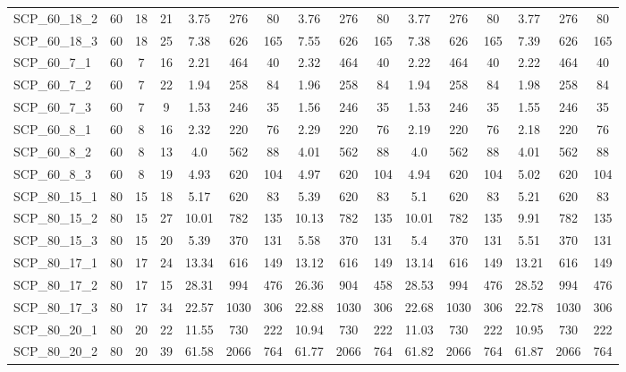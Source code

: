 \begin{sidewaystable}[!ht]
{\begin{tabular}{lccccccccccccccc}
SCP\_60\_18\_2 & 60 & 18 & 21 &  \textcolor{blue2}{3.75} & 276 & 80 & 3.76 & 276 & 80 & 3.77 & 276 & 80 & 3.77 & 276 & 80 \\
SCP\_60\_18\_3 & 60 & 18 & 25 &  \textcolor{blue2}{7.38} & 626 & 165 & 7.55 & 626 & 165 &  \textcolor{blue2}{7.38} & 626 & 165 & 7.39 & 626 & 165 \\
SCP\_60\_7\_1 & 60 & 7 & 16 &  \textcolor{blue2}{2.21} & 464 & 40 & 2.32 & 464 & 40 & 2.22 & 464 & 40 & 2.22 & 464 & 40 \\
SCP\_60\_7\_2 & 60 & 7 & 22 &  \textcolor{blue2}{1.94} & 258 & 84 & 1.96 & 258 & 84 &  \textcolor{blue2}{1.94} & 258 & 84 & 1.98 & 258 & 84 \\
SCP\_60\_7\_3 & 60 & 7 & 9 &  \textcolor{blue2}{1.53} & 246 & 35 & 1.56 & 246 & 35 &  \textcolor{blue2}{1.53} & 246 & 35 & 1.55 & 246 & 35 \\
SCP\_60\_8\_1 & 60 & 8 & 16 & 2.32 & 220 & 76 & 2.29 & 220 & 76 & 2.19 & 220 & 76 &  \textcolor{blue2}{2.18} & 220 & 76 \\
SCP\_60\_8\_2 & 60 & 8 & 13 &  \textcolor{blue2}{4.0} & 562 & 88 & 4.01 & 562 & 88 &  \textcolor{blue2}{4.0} & 562 & 88 & 4.01 & 562 & 88 \\
SCP\_60\_8\_3 & 60 & 8 & 19 &  \textcolor{blue2}{4.93} & 620 & 104 & 4.97 & 620 & 104 & 4.94 & 620 & 104 & 5.02 & 620 & 104 \\
SCP\_80\_15\_1 & 80 & 15 & 18 & 5.17 & 620 & 83 & 5.39 & 620 & 83 &  \textcolor{blue2}{5.1} & 620 & 83 & 5.21 & 620 & 83 \\
SCP\_80\_15\_2 & 80 & 15 & 27 & 10.01 & 782 & 135 & 10.13 & 782 & 135 & 10.01 & 782 & 135 &  \textcolor{blue2}{9.91} & 782 & 135 \\
SCP\_80\_15\_3 & 80 & 15 & 20 & 5.39 & 370 & 131 & 5.58 & 370 & 131 & 5.4 & 370 & 131 & 5.51 & 370 & 131 \\
SCP\_80\_17\_1 & 80 & 17 & 24 & 13.34 & 616 & 149 &  \textcolor{blue2}{13.12} & 616 & 149 & 13.14 & 616 & 149 & 13.21 & 616 & 149 \\
SCP\_80\_17\_2 & 80 & 17 & 15 & 28.31 & 994 & 476 & 26.36 & 904 & 458 & 28.53 & 994 & 476 & 28.52 & 994 & 476 \\
SCP\_80\_17\_3 & 80 & 17 & 34 & 22.57 & 1030 & 306 & 22.88 & 1030 & 306 & 22.68 & 1030 & 306 & 22.78 & 1030 & 306 \\
SCP\_80\_20\_1 & 80 & 20 & 22 & 11.55 & 730 & 222 &  \textcolor{blue2}{10.94} & 730 & 222 & 11.03 & 730 & 222 & 10.95 & 730 & 222 \\
SCP\_80\_20\_2 & 80 & 20 & 39 & 61.58 & 2066 & 764 & 61.77 & 2066 & 764 & 61.82 & 2066 & 764 & 61.87 & 2066 & 764 \\

\end{tabular}}
\end{sidewaystable}
